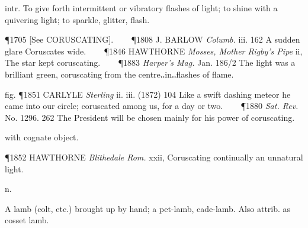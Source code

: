 \begin{description}[wide, labelwidth=!, labelindent=0pt]
\begin{myenumerate}

 intr. To give forth intermittent or vibratory flashes of light; to shine with a quivering light; to sparkle, glitter, flash.

\P 1705 [See CORUSCATING].    
\P 1808 J. BARLOW  \textit{Columb.} iii. 162 A sudden glare Coruscates wide.    
\P 1846 HAWTHORNE  \textit{Mosses, Mother Rigby's Pipe} ii, The star kept coruscating.    
\P 1883  \textit{Harper's Mag.} Jan. 186/2 The light was a brilliant green, coruscating from the centre‥in‥flashes of flame.

fig. \P 1851 CARLYLE  \textit{Sterling} ii. iii. (1872) 104 Like a swift dashing meteor he came into our circle; coruscated among us, for a day or two.    
\P 1880  \textit{Sat. Rev.} No. 1296. 262 The President will be chosen mainly for his power of coruscating.

 with cognate object.

\P 1852 HAWTHORNE  \textit{Blithedale Rom.} xxii, Coruscating continually an unnatural light.
\end{myenumerate}


 n.

\noindent {}

\noindent [Not found before the 16th c.: derivation uncertain.

   Prof. Skeat (Trans. Philol. Soc. 1889) has suggested that it is the same word as OE. cot-sǽta cot-sitter, dweller in a cot, cottar; cf. the Domesday forms, pl. coscez, cozets, cozez (z = ts). This is phonetically satisfactory, and the sense of ‘lamb dwelling in a cot’ or ‘kept by a cot-sǽta or cottar’ finds support in It. casiccio a tame lamb bred by hand, f. casa house; Ger. hauslamm house-lamb and ‘pet’, is analogous. Cf. also ‘Cotts, lambs brought up by hand, cades’, Marshall Rural Econ. E. Norfolk, 1787 (whence in Grose 1790). There is however a long gap between the coscez of Domesday and the cosset of 1579, during which no trace of the word in either sense has been found.] 

\vspace{-0.3cm}

\begin{myenumerate}

 A lamb (colt, etc.) brought up by hand; a pet-lamb, cade-lamb. Also attrib. as cosset lamb.


\end{myenumerate}
\end{description}
